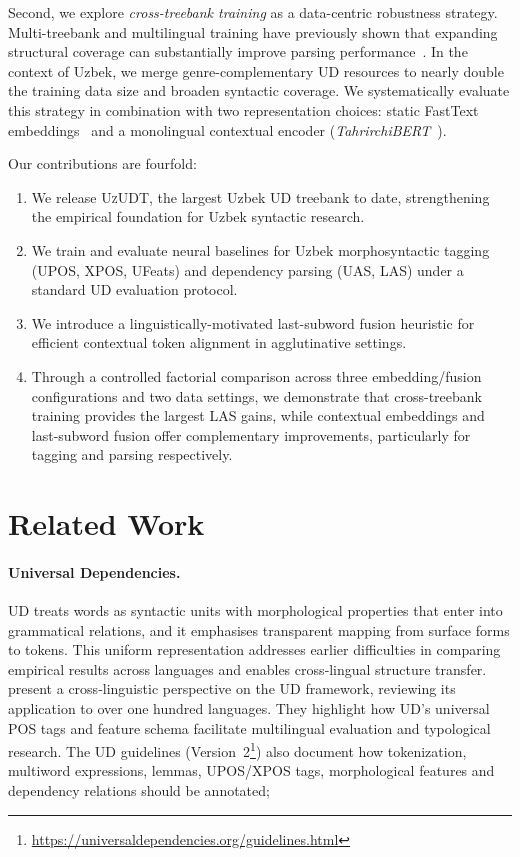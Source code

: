 \documentclass[runningheads]{llncs}
\begin{document}
Second, we explore \emph{cross-treebank training} as a data-centric
robustness strategy.
Multi-treebank and multilingual training have previously shown
that expanding structural coverage can substantially improve parsing
performance~\cite{1602.01925,zeman-etal-2018-conll}.
In the context of Uzbek, we merge genre-complementary UD resources to
nearly double the training data size and broaden syntactic coverage.
We systematically evaluate this strategy in combination with two
representation choices: static FastText
embeddings~\cite{bojanowski-etal-2017-enriching} and a monolingual
contextual encoder
(\textit{TahrirchiBERT}~\cite{Mamasaidov2023TahrirchiBERT}).

Our contributions are fourfold:
\begin{enumerate}
    \item We release \textsc{UzUDT}, the largest Uzbek UD treebank to
      date, strengthening the empirical foundation for Uzbek syntactic
      research.
    \item We train and evaluate neural baselines for Uzbek
      morphosyntactic tagging (UPOS, XPOS, UFeats) and dependency
      parsing (UAS, LAS) under a standard UD evaluation protocol.
    \item We introduce a linguistically-motivated last-subword fusion
      heuristic for efficient contextual token alignment in
      agglutinative settings.
    \item Through a controlled factorial comparison across three
      embedding\slash fusion configurations and two data settings, we
      demonstrate that cross-treebank training provides the largest
      LAS gains, while contextual embeddings and last-subword fusion
      offer complementary improvements, particularly for tagging and
      parsing respectively.
\end{enumerate}
\section{Related Work}
\paragraph{Universal Dependencies.}
 UD treats words as syntactic units with morphological properties that enter into grammatical relations, and it emphasises transparent mapping from surface forms to tokens.  This uniform representation addresses earlier difficulties in comparing empirical results across languages and enables cross‑lingual structure transfer. \cite{de-marneffe-etal-2021-universal} present a cross‑linguistic perspective on the UD framework, reviewing its application to over one hundred languages.  They highlight how UD’s universal POS tags and feature schema facilitate multilingual evaluation and typological research.  The UD guidelines (Version 2\footnote{\url{https://universaldependencies.org/guidelines.html}}) also document how tokenization, multiword expressions, lemmas, UPOS/XPOS tags, morphological features and dependency relations should be annotated;
\end{document}
